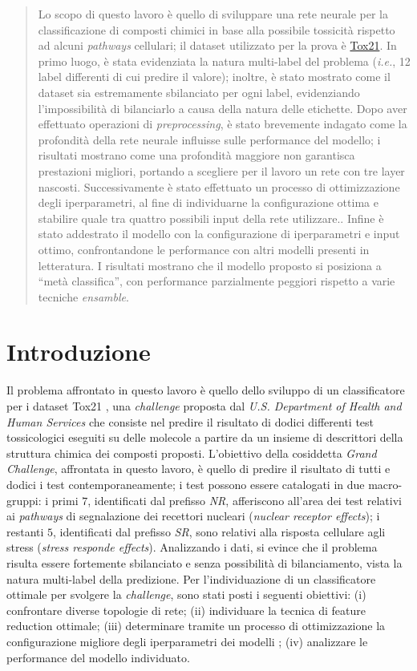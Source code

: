 \begin{abstract}
Lo scopo di questo lavoro è quello di sviluppare una rete neurale per la classificazione di composti chimici in base alla possibile tossicità rispetto ad alcuni \textit{pathways} cellulari; il dataset utilizzato per la prova è \href{http://bioinf.jku.at/research/DeepTox/tox21.html}{Tox21}.
In primo luogo, è stata evidenziata la natura multi-label del problema (\textit{i.e.}, 12 label differenti di cui predire il valore); inoltre, è stato mostrato come il dataset sia estremamente sbilanciato per ogni label, evidenziando l'impossibilità di bilanciarlo a causa della natura delle etichette.
Dopo aver effettuato operazioni di \textit{preprocessing}, è stato brevemente indagato come la profondità della rete neurale influisse sulle performance del modello; i risultati mostrano come una profondità maggiore non garantisca prestazioni migliori, portando a scegliere per il lavoro un rete con tre layer nascosti.
Successivamente è stato effettuato un processo di ottimizzazione degli iperparametri, al fine di individuarne la configurazione ottima e stabilire quale tra quattro possibili input della rete utilizzare..
Infine è stato addestrato il modello con la configurazione di iperparametri e input ottimo, confrontandone le performance con altri modelli presenti in letteratura.
I risultati mostrano che il modello proposto si posiziona a “metà classifica”, con performance parzialmente peggiori rispetto a varie tecniche \textit{ensamble}.
\end{abstract}

\section{Introduzione}
Il problema affrontato in questo lavoro è quello dello sviluppo di un classificatore per i dataset Tox21 \cite{challenge_site}, una \textit{challenge} proposta dal \textit{U.S. Department of Health and Human Services} che consiste nel predire il risultato di dodici differenti test tossicologici eseguiti su delle molecole a partire da un insieme di descrittori della struttura chimica dei composti proposti.
L'obiettivo della cosiddetta \textit{Grand Challenge}, affrontata in questo lavoro, è quello di predire il risultato di tutti e dodici i test contemporaneamente; i test possono essere catalogati in due macro-gruppi: i primi $7$, identificati dal prefisso \textit{NR}, afferiscono all'area dei test relativi ai \textit{pathways} di segnalazione dei recettori nucleari (\textit{nuclear receptor effects}); i restanti $5$, identificati dal prefisso \textit{SR}, sono relativi alla risposta cellulare agli stress (\textit{stress responde effects}).
Analizzando i dati, si evince che il problema risulta essere fortemente sbilanciato e senza possibilità di bilanciamento, vista la natura multi-label della predizione.
Per l'individuazione di un classificatore ottimale per svolgere la \textit{challenge}, sono stati posti i seguenti obiettivi: (i) confrontare diverse topologie di rete; (ii) individuare la tecnica di feature reduction ottimale; (iii) determinare tramite un processo di ottimizzazione la configurazione migliore degli iperparametri dei modelli ; (iv) analizzare le performance del modello individuato.